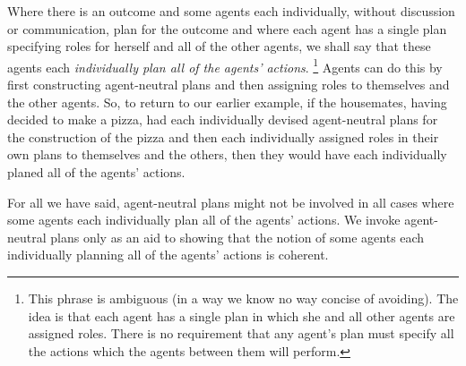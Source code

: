 \documentclass[12pt,\papersize]{extarticle}
\begin{document}
Where there is an outcome and some agents each individually,
without discussion or communication,
plan for the outcome 
and where each agent has a single plan specifying roles for herself and all of the other agents,
we shall say that these agents each \emph{individually plan all of the agents' actions}.%
\footnote{
This phrase is ambiguous (in a way we know  no way concise of avoiding).
The idea is that each agent has a single plan in which she and  all other agents are assigned roles.
There is no requirement that any agent's plan must specify all the actions which the agents between them will perform.
}
Agents can do this by first constructing agent-neutral plans and then assigning roles to themselves and the other agents.
So, to return to our earlier example, 
 if the housemates, having decided to make a pizza, had each individually devised  agent-neutral plans for the construction of the pizza and then each individually assigned roles in their own plans to themselves and the others, 
then they would have each individually planed all of the agents' actions.

For all we have said,  agent-neutral plans might not be involved in all cases where some agents each individually plan all of the agents' actions.
We invoke agent-neutral plans only as an aid to showing that the notion of some 
agents each individually planning all of the agents' actions is coherent.
\end{document}
